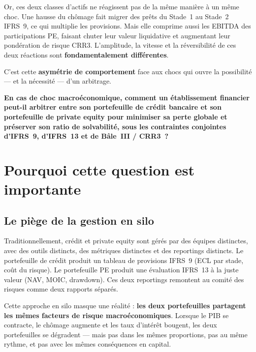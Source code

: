 \documentclass[12pt,a4paper]{article}
\begin{document}
Or, ces deux classes d'actifs ne réagissent pas de la même manière à un même choc. Une hausse du chômage fait migrer des prêts du Stade~1 au Stade~2 IFRS~9, ce qui multiplie les provisions. Mais elle comprime aussi les EBITDA des participations PE, faisant chuter leur valeur liquidative et augmentant leur pondération de risque CRR3. L'amplitude, la vitesse et la réversibilité de ces deux réactions sont \textbf{fondamentalement différentes}.

C'est cette \textbf{asymétrie de comportement} face aux chocs qui ouvre la possibilité --- et la nécessité --- d'un arbitrage.

\begin{thesis}
\textbf{En cas de choc macroéconomique, comment un établissement financier peut-il arbitrer entre son portefeuille de crédit bancaire et son portefeuille de private equity pour minimiser sa perte globale et préserver son ratio de solvabilité, sous les contraintes conjointes d'IFRS~9, d'IFRS~13 et de Bâle~III / CRR3~?}
\end{thesis}

\section{Pourquoi cette question est importante}

\subsection{Le piège de la gestion en silo}

Traditionnellement, crédit et private equity sont gérés par des équipes distinctes, avec des outils distincts, des métriques distinctes et des reportings distincts. Le portefeuille de crédit produit un tableau de provisions IFRS~9 (ECL par stade, coût du risque). Le portefeuille PE produit une évaluation IFRS~13 à la juste valeur (NAV, MOIC, drawdown). Ces deux reportings remontent au comité des risques comme deux rapports séparés.

Cette approche en silo masque une réalité : \textbf{les deux portefeuilles partagent les mêmes facteurs de risque macroéconomiques}. Lorsque le PIB se contracte, le chômage augmente et les taux d'intérêt bougent, les deux portefeuilles se dégradent --- mais pas dans les mêmes proportions, pas au même rythme, et pas avec les mêmes conséquences en capital.
\end{document}
